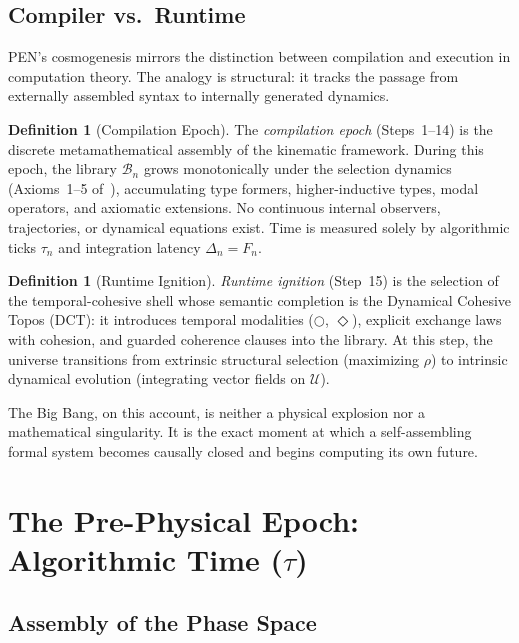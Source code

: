 \documentclass[11pt,a4paper]{article}
\theoremstyle{plain}
\theoremstyle{definition}
\newtheorem{definition}[theorem]{Definition}
\theoremstyle{remark}
\newcommand{\U}{\mathcal{U}}
\newcommand{\B}{\mathcal{B}}
\newcommand{\nextmod}{\bigcirc}
\newcommand{\eventually}{\Diamond}
\begin{document}
\subsection{Compiler vs.\ Runtime}
\label{sec:compiler-runtime}

PEN's cosmogenesis mirrors the distinction between compilation and execution in computation theory.
The analogy is structural: it tracks the passage from externally assembled syntax to internally generated dynamics.

\begin{definition}[Compilation Epoch]
\label{def:compilation}
The \emph{compilation epoch} (Steps~1--14) is the discrete metamathematical assembly of the kinematic framework.
During this epoch, the library $\B_n$ grows monotonically under the selection dynamics (Axioms~1--5 of~\cite{pen}), accumulating type formers, higher-inductive types, modal operators, and axiomatic extensions.
No continuous internal observers, trajectories, or dynamical equations exist.
Time is measured solely by algorithmic ticks $\tau_n$ and integration latency $\Delta_n = F_n$.
\end{definition}

\begin{definition}[Runtime Ignition]
\label{def:ignition}
\emph{Runtime ignition} (Step~15) is the selection of the temporal-cohesive shell whose semantic completion is the Dynamical Cohesive Topos (DCT): it introduces temporal modalities ($\nextmod$, $\eventually$), explicit exchange laws with cohesion, and guarded coherence clauses into the library.
At this step, the universe transitions from extrinsic structural selection (maximizing $\rho$) to intrinsic dynamical evolution (integrating vector fields on $\U$).
\end{definition}

The Big Bang, on this account, is neither a physical explosion nor a mathematical singularity.
It is the exact moment at which a self-assembling formal system becomes causally closed and begins computing its own future.


\section{The Pre-Physical Epoch: Algorithmic Time \texorpdfstring{($\tau$)}{(tau)}}
\label{sec:pre-physical}

\subsection{Assembly of the Phase Space}
\label{sec:assembly}
\end{document}
